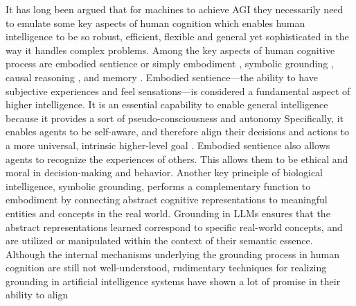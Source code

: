 \documentclass[10pt,journal,compsoc]{IEEEtran}
\begin{document}
	It has long been argued that for machines to achieve AGI they necessarily need to emulate some key aspects of human cognition which enables human intelligence to be so robust, efficient, flexible and general yet sophisticated in the way it handles complex problems. Among the key aspects of human cognitive process are embodied sentience or simply embodiment \cite{howard2019evolving,durt2023against}, symbolic grounding \cite{harnad1990symbol}, causal reasoning \cite{goddu2024development,marwala2015causality}, and memory \cite{schweizer2004attention,conway2003working,alexander1997intelligence}. Embodied sentience—the ability to have subjective experiences and feel sensations—is considered a fundamental aspect of higher intelligence. It is an essential capability to enable general intelligence because it provides a sort of pseudo-consciousness and autonomy \cite{torres2024embodied,lin2024embodied,chalmers2023could} Specifically, it enables agents to be self-aware, and therefore align their decisions and actions to a more universal, intrinsic higher-level goal \cite{pezzulo2014principles,morsella2020motor,barandiaran2024transforming}. Embodied sentience also allows agents to recognize the experiences of others. This allows them to be ethical and moral in decision-making and behavior. Another key principle of biological intelligence, symbolic grounding, performs a complementary function to embodiment by connecting abstract cognitive representations to meaningful entities and concepts in the real world.  Grounding in LLMs ensures that the abstract representations learned correspond to specific real-world concepts, and are utilized or manipulated within the context of their semantic essence. Although the internal mechanisms underlying the grounding process in human cognition are still not well-understood, rudimentary techniques for realizing grounding in artificial intelligence systems have shown a lot of promise in their ability to align
\end{document}
